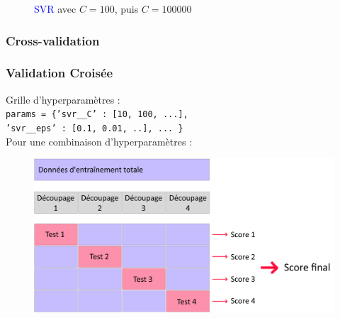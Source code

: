 \documentclass{beamer}[aspectratio = 43]
\begin{document}
\begin{frame}
\begin{figure}[h]
\begin{minipage}{0.5\textwidth}
		\end{minipage}
		\caption{\textcolor{blue}{SVR} avec $C=100$, puis $C=100000$}
	\end{figure}
\end{frame}

\subsubsection*{Cross-validation}
\begin{frame}
	\frametitle{Validation Croisée}
	Grille d'hyperparamètres :\\
	\hspace{1cm}\texttt{params = \{'svr\_\_C' : [10, 100, ...],
		\\ \hspace{3cm}'svr\_\_eps' : [0.1, 0.01, ..], ... \} }
	\onslide<2>
	\vspace{0.2cm}
	\\Pour une combinaison d'hyperparamètres :
	\begin{figure}[h]
		\centering
		\includegraphics[scale=0.21]{VC}
	\end{figure}
\end{frame}
\end{document}

